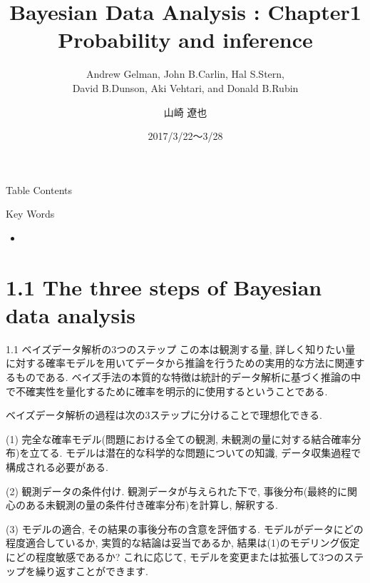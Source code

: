 \documentclass[10pt,dvipdfmx,a4]{beamer}
\title{Bayesian Data Analysis : Chapter1 \\Probability and inference}
\subtitle{Andrew Gelman, John B.Carlin, Hal S.Stern,\\David B.Dunson, Aki Vehtari, and Donald B.Rubin}
\author{山崎 遼也}
\institute{情報学科 数理工学コース 4回}
\date{2017/3/22～3/28}
\begin{document}
\frame{\titlepage}

\begin{frame}{Table Contents}
\begin{multicols}{2}
{\scriptsize \tableofcontents}
\end{multicols}
\end{frame}

\begin{frame}{Key Words}
\begin{multicols}{2}
{\scriptsize \begin{itemize}
\item 
\end{itemize}}
\end{multicols}
\end{frame}

\section{1.1 The three steps of Bayesian data analysis}
\begin{frame}{1.1 ベイズデータ解析の3つのステップ}
この本は観測する量, 詳しく知りたい量に対する確率モデルを用いてデータから推論を行うための実用的な方法に関連するものである.
ベイズ手法の本質的な特徴は統計的データ解析に基づく推論の中で不確実性を量化するために確率を明示的に使用するということである.

ベイズデータ解析の過程は次の3ステップに分けることで理想化できる.

(1) 完全な確率モデル(問題における全ての観測, 未観測の量に対する結合確率分布)を立てる.
モデルは潜在的な科学的な問題についての知識, データ収集過程で構成される必要がある.

(2) 観測データの条件付け.
観測データが与えられた下で, 事後分布(最終的に関心のある未観測の量の条件付き確率分布)を計算し, 解釈する.

(3) モデルの適合, その結果の事後分布の含意を評価する.
モデルがデータにどの程度適合しているか, 実質的な結論は妥当であるか, 結果は(1)のモデリング仮定にどの程度敏感であるか?
これに応じて, モデルを変更または拡張して3つのステップを繰り返すことができます.
\end{frame}

\end{document}
